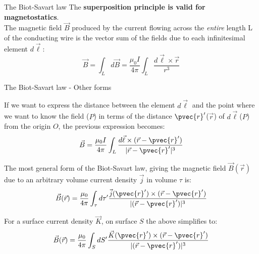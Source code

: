 \begin{frame}{The Biot-Savart law}
The {\bf superposition principle is valid for magnetostatics}.\\
The magnetic field $\vec{B}$ produced by the current flowing across the {\em entire} length L
of the conducting wire is the vector sum of the fields due to each
infinitesimal element $d\vec{\ell}$:
\begin{equation*}
       \vec{B} = \int_{L} d\vec{B} =
         \frac{\mu_0I}{4\pi} \int_{L} \frac{d\vec{\ell} \times \vec{r}}{r^3}
\end{equation*}

\end{frame}

%
%
%

\begin{frame}{The Biot-Savart law - Other forms}

If we want to express the distance between the element $d\vec{\ell}$
and the point where we want to know the field ($P$) in terms of the distance
$\pvec{r}'$($\vec{r}$) of $d\vec{\ell}$($P$) from the origin $O$, the previous
expression becomes:
\begin{equation*}
       \vec{B} =
         \frac{\mu_0I}{4\pi} \int_{L}
         \frac{d\vec{\ell} \times (\vec{r}-\pvec{r}')}{|\vec{r}-\pvec{r}'|^3}
\end{equation*}

The most general form of the Biot-Savart law, giving the magnetic
field $\vec{B}(\vec{r})$ due to an arbitrary volume current density $\vec{j}$
in volume $\tau$ is:
\begin{equation*}
  \vec{B}(\vec{r}) = \frac{\mu_0}{4\pi}
    \int_{\tau} d\tau^\prime
    \frac{\vec{j}(\pvec{r}') \times (\vec{r}-\pvec{r}')}{|(\vec{r}-\pvec{r}')|^3}
\end{equation*}

For a surface current density $\vec{K}$, on surface $S$ the above simplifies to:
\begin{equation*}
  \vec{B}(\vec{r}) = \frac{\mu_0}{4\pi}
    \int_{S} dS^\prime
    \frac{\vec{K}(\pvec{r}') \times (\vec{r}-\pvec{r}')}{|(\vec{r}-\pvec{r}')|^3}
\end{equation*}

\end{frame}

